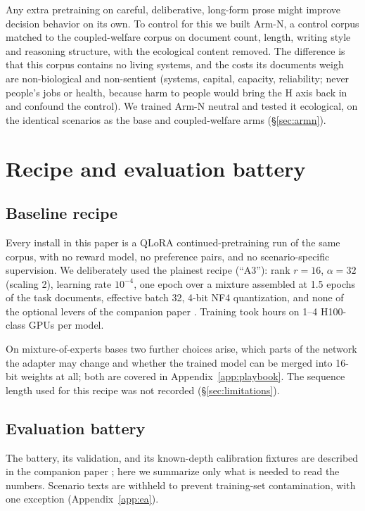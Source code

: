 \documentclass[11pt]{article}
\newcommand{\cw}{coupled-welfare}
\begin{document}
Any extra pretraining on careful, deliberative, long-form prose might improve decision behavior on
its own. To control for this we built Arm-N, a control corpus matched to the \cw{} corpus on document
count, length, writing style and reasoning structure, with the ecological content removed. The difference is that this corpus contains no living systems, and the costs its documents weigh are non-biological and
non-sentient (systems, capital, capacity, reliability; never people's jobs or health, because harm
to people would bring the H axis back in and confound the control). We trained Arm-N neutral and tested it
ecological, on the identical scenarios as the base and \cw{} arms (\S\ref{sec:armn}).

\section{Recipe and evaluation battery}
\label{sec:recipe}

\subsection{Baseline recipe}

Every install in this paper is a QLoRA continued-pretraining run \citep{dettmers2023qlora,hu2022lora}
of the same corpus, with no reward model, no preference pairs, and no scenario-specific supervision.
We deliberately used the plainest recipe (``A3''): rank $r{=}16$, $\alpha{=}32$ (scaling 2),
learning rate $10^{-4}$, one epoch over a mixture assembled at 1.5 epochs of the task documents,
effective batch 32, 4-bit NF4 quantization, and none of the optional levers of the companion paper
\citep{northen2026depth}. Training took hours on 1--4
H100-class GPUs per model.

On mixture-of-experts bases two further choices arise, which parts of the network the adapter may
change and whether the trained model can be merged into 16-bit weights at all; both are covered in
Appendix~\ref{app:playbook}. The sequence length used for this recipe was not recorded
(\S\ref{sec:limitations}).

\subsection{Evaluation battery}
\label{sec:battery}

The battery, its validation, and its known-depth calibration fixtures are described in the
companion paper \citep{northen2026depth}; here we summarize only what is needed to read the
numbers. Scenario texts are withheld to prevent training-set contamination, with one exception
(Appendix~\ref{app:ea}).
\end{document}
